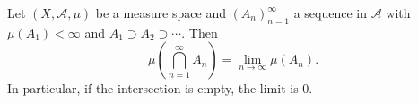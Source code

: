 Let $(X, \mathcal{A}, \mu)$ be a measure space and $(A_n)_{n=1}^{\infty}$ a sequence in $\mathcal{A}$ with $\mu(A_1) < \infty$ and $A_1 \supset A_2 \supset \cdots$. Then
$$\mu\left(\bigcap_{n=1}^{\infty} A_n\right) = \lim_{n \to \infty} \mu(A_n).$$
In particular, if the intersection is empty, the limit is $0$.